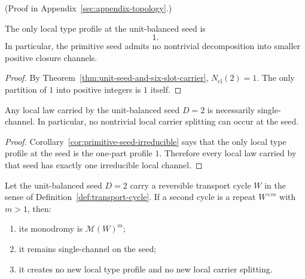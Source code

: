 (Proof in Appendix~\ref{sec:appendix-topology}.)

\begin{corollary}
\label{cor:primitive-seed-irreducible}
The only local type profile at the unit-balanced seed is
\[
1.
\]
In particular, the primitive seed admits no nontrivial decomposition into
smaller positive closure channels.
\end{corollary}

\begin{proof}
By Theorem~\ref{thm:unit-seed-and-six-slot-carrier},
$N_{\mathrm{cl}}(2)=1$. The only partition of $1$ into positive integers is
$1$ itself.
\end{proof}

\begin{corollary}
\label{cor:single-channel-unit-seed}
Any local law carried by the unit-balanced seed $D=2$ is necessarily
single-channel. In particular, no nontrivial local carrier splitting can occur
at the seed.
\end{corollary}

\begin{proof}
Corollary~\ref{cor:primitive-seed-irreducible} says that the only local type
profile at the seed is the one-part profile \(1\). Therefore every local law
carried by that seed has exactly one irreducible local channel.
\end{proof}

\begin{corollary}
\label{cor:d2-repeat-no-new-carrier}
Let the unit-balanced seed \(D=2\) carry a reversible transport cycle \(W\) in
the sense of Definition~\ref{def:transport-cycle}. If a second cycle is a
repeat \(W^{\times m}\) with \(m>1\), then:
\begin{enumerate}[label=(\roman*), itemsep=0.2em]
\item its monodromy is \(\mathcal M(W)^m\);
\item it remains single-channel on the seed;
\item it creates no new local type profile and no new local carrier splitting.
\end{enumerate}
\end{corollary}

